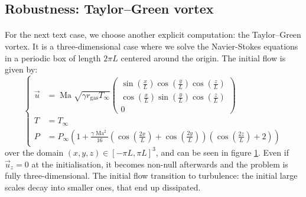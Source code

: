     \subsection{Robustness: Taylor--Green vortex}

      \paragraph{}
      For the next text case, we choose another explicit computation: the Taylor--Green vortex.
      It is a three-dimensional case where we solve the Navier-Stokes equations in a periodic box of length $2 \pi L$ centered around the origin.
      The initial flow is given by:
      \begin{equation}\label{eq:tgv}
        \left\{\begin{aligned}
          \vec{u} &= \operatorname{Ma} \sqrt{\gamma r_\textrm{gas} T_\infty} \begin{pmatrix}
            \sin\left(\frac{x}{L}\right) \cos\left(\frac{y}{L}\right) \cos\left(\frac{z}{L}\right) \\[10pt]
            \cos\left(\frac{x}{L}\right) \sin\left(\frac{y}{L}\right) \cos\left(\frac{z}{L}\right) \\[10pt]
            0
          \end{pmatrix} \\[10pt]
          T &= T_\infty \\[10pt]
          P &= P_\infty \left(1 + \frac{\gamma \operatorname{Ma}^2}{16} \left(\cos\left(\frac{2x}{L}\right) + \cos\left(\frac{2y}{L}\right)\right) \left(\cos\left(\frac{2z}{L}\right) + 2\right) \right)
        \end{aligned}\right.
      \end{equation}
      over the domain $\left(x, y, z\right) \in \left[-\pi L, \pi L\right]^3$, and can be seen in figure \ref{fig:tgv}.
      Even if $\vec{u}_z = 0$ at the initialisation, it becomes non-null afterwards and the problem is fully three-dimensional.
      The initial flow transition to turbulence: the initial large scales decay into smaller ones, that end up dissipated.

      \begin{figure}
        \centering
        \caption{}
        \label{fig:tgv}
      \end{figure}


